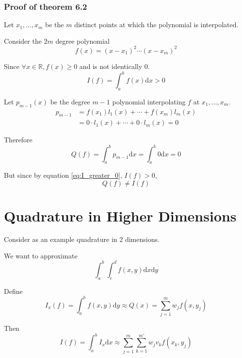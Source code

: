 \documentclass[12pt,letterpaper]{article}
\newcommand{\R}{\mathbb{R}}
\newcommand{\dd}{\mathrm{d}}
\begin{document}
\subsubsection*{Proof of theorem 6.2}
Let $x_1, \dots, x_m$ be the $m$ distinct points at which the polynomial is interpolated.

Consider the $2m$ degree polynomial
\begin{equation}
	f(x) = (x-x_1)^2 \cdots (x-x_m)^2
\end{equation}

Since $\forall x \in \R, f(x) \geq 0$ and is not identically $0$.
\begin{equation}\label{eq:I_greater_0}
	I(f) = \int_a^b f(x) \dd x > 0
\end{equation}

Let $p_{m-1}(x)$ be the degree $m-1$ polynomial interpolating $f$ at $x_1, \dots, x_m$.
\begin{align}
	p_{m-1} &= f(x_1) l_1(x) + \cdots + f(x_m) l_m(x) \\
	&= 0 \cdot l_1(x) + \cdots + 0 \cdot l_m(x) = 0
\end{align}

Therefore
\begin{equation}
	Q(f) = \int_a^b p_{m-1} \dd x = \int_a^b 0 \dd x = 0
\end{equation}

But since by equation \ref{eq:I_greater_0}, $I(f) > 0$,
\begin{equation}
	Q(f) \neq I(f)
\end{equation}


\section{Quadrature in Higher Dimensions}
Consider as an example quadrature in 2 dimensions.

We want to approximate
\begin{equation}
	\int_a^b \int_c^d f(x,y) \dd x \dd y
\end{equation}

Define
\begin{equation}
	I_x(f) = \int_a^b f(x,y) \dd y \approx Q(x) = \sum_{j=1}^m w_j f(x, y_j)
\end{equation}

Then
\begin{equation}
	I(f) = \int_a^b I_x \dd x \approx \sum_{j=1}^m \sum_{k=1}^{m'} w_j v_k f(x_k, y_j)
\end{equation}
\end{document}
